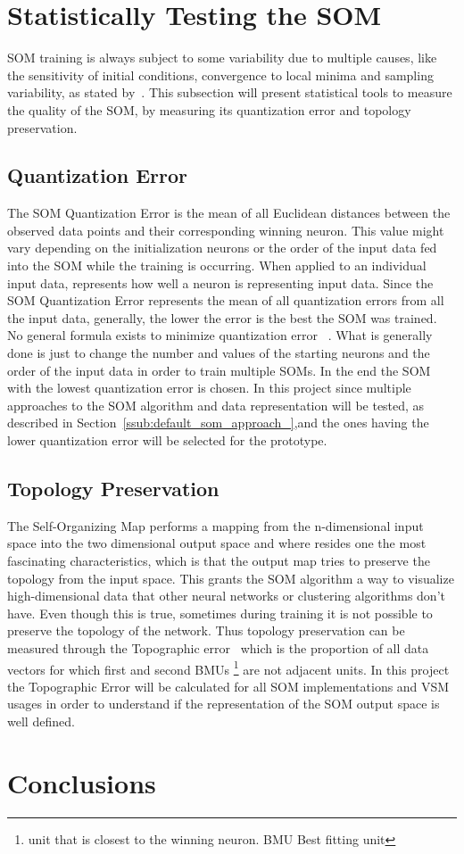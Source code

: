 \section{Statistically Testing the SOM} 
\label{sec:cluster_quality_testing}
SOM training is always subject to some variability due to multiple causes, like the sensitivity of initial conditions, convergence to local minima and sampling variability, as stated by~\citet{Bodt}. This subsection will present statistical tools to measure the quality of the SOM, by measuring its quantization error and topology preservation.

\subsection{Quantization Error} 
\label{sub:quantization_error}
The SOM Quantization Error is the mean of all Euclidean distances between the observed data points and their corresponding winning neuron. This value might vary depending on the initialization neurons or the order of the input data fed into the SOM while the training is occurring. When applied to an individual input data, represents how well a neuron is representing input data. Since the SOM Quantization Error represents the mean of all quantization errors from all the input data, generally, the lower the error is the best the SOM was trained.
\\
No general formula exists to minimize quantization error~\cite{Bodt} . What is generally done is just to change the number and values of the starting neurons and the order of the input data in order to train multiple SOMs. In the end the SOM with the lowest quantization error is chosen.
In this project since multiple approaches to the SOM algorithm and data representation will be tested, as described in Section~\ref{ssub:default_som_approach_},and the ones having the lower quantization error will be selected for the prototype.

\subsection{Topology Preservation} 
\label{sub:topology_preservation}
The Self-Organizing Map performs a mapping from the n-dimensional input space into the two dimensional output space and where resides one the most fascinating characteristics, which is that the output map tries to preserve the topology from the input space. This grants the SOM algorithm a way to visualize high-dimensional data that other neural networks or clustering algorithms don't have. Even though this is true, sometimes during training it is not possible to preserve the topology of the network.
Thus topology preservation can be measured through the Topographic error~\citet{Kiviluoto1996} which is the proportion of all data vectors for which first and second BMUs \footnote{unit that is closest to the winning neuron. BMU Best fitting unit } are not adjacent units.
In this project the Topographic Error will be calculated for all SOM implementations and VSM usages in order to understand if the representation of the SOM output space is well defined.


\section{Conclusions}

\cleardoublepage
 
